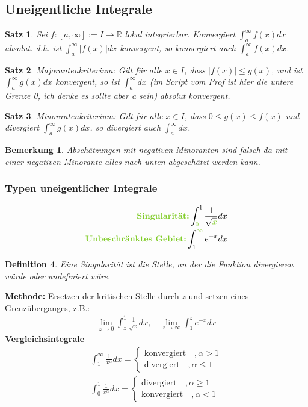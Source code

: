 \documentclass[12pt,a4paper]{article}%
\newtheorem{satz}{Satz}[section]
\newtheorem{definition}[satz]{Definition}
\newtheorem{bem}{Bemerkung}[section]
\numberwithin{equation}{section}
\newcommand{\R}{\mathbb{R}} %
\def\colGreen#1{\begingroup\color{LimeGreen}{#1}\endgroup}
\numberwithin{equation}{subsection}
\begin{document}
\subsection{Uneigentliche Integrale}
  \begin{satz}
    Sei $f:[a, \infty] := I \rightarrow \R$ lokal integrierbar. Konvergiert $\int_a^\infty f(x) dx$ absolut. d.h. ist $\int_a^\infty |f(x)| dx$ konvergent, so konvergiert auch $\int_a^\infty f(x) dx$.
  \end{satz}
  \begin{satz}
    Majorantenkriterium: Gilt für alle $x\in I$, dass $|f(x)| \leq g(x)$, und ist $\int_a^\infty g(x) dx$ konvergent, so ist $\int_a^\infty dx$ (im Script vom Prof ist hier die untere Grenze 0, ich denke es sollte aber a sein) absolut konvergent.    
  \end{satz}
  \begin{satz}
    Minorantenkriterium: Gilt für alle $x\in I$, dass $0 \leq g(x) \leq f(x)$ und divergiert $\int_a^\infty g(x) dx$, so divergiert auch $\int_a^\infty dx$.
  \end{satz}
  \begin{bem}
    Abschätzungen mit negativen Minoranten sind falsch da mit einer negativen Minorante alles nach unten abgeschätzt werden kann.
  \end{bem}
  \subsubsection{Typen uneigentlicher Integrale}
  \begin{align}
    \textbf{\colGreen{Singularität:} }\int_{\colGreen{0}}^1 \frac{1}{\sqrt{\colGreen{x}}} dx \nonumber \\
    \textbf{\colGreen{Unbeschränktes Gebiet:} }\int_1^{\colGreen{\infty}} e^{-x} dx \nonumber \\
  \end{align}
  \begin{definition}
    Eine Singularität ist die Stelle, an der die Funktion divergieren würde oder undefiniert wäre.
  \end{definition}
  \textbf{Methode:} Ersetzen der kritischen Stelle durch $z$ und setzen eines Grenzüberganges, z.B.:
  \begin{align*}
    \lim\limits_{z\rightarrow0} \int_z^1 \frac{1}{\sqrt{x}} dx, \quad \lim\limits_{z\rightarrow \infty} \int_1^z e^{-x} dx
  \end{align*}
  \textbf{Vergleichsintegrale}
  \begin{align}
    \int_1^\infty \frac{1}{x^\alpha} dx = 
    \begin{cases}
      \text{konvergiert}\quad , \alpha > 1 \\
      \text{divergiert}\quad , \alpha \leq 1
    \end{cases} \nonumber\\
    \int_0^1 \frac{1}{x^\alpha} dx = 
    \begin{cases}
      \text{divergiert}\quad , \alpha \geq 1 \\
      \text{konvergiert}\quad , \alpha < 1
    \end{cases} \nonumber\\    
  \end{align}
\end{document}
